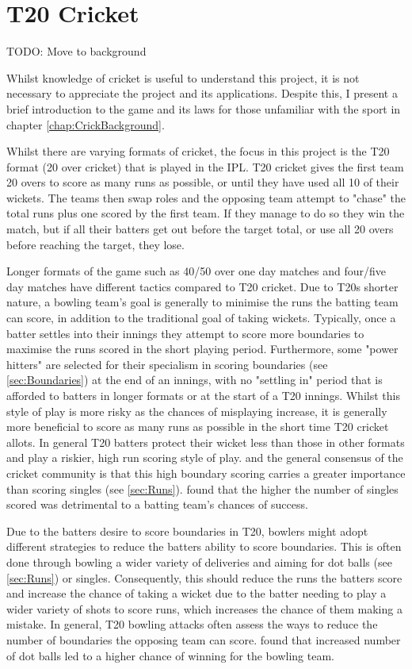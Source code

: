 \documentclass[12pt,a4paper]{report}
\theoremstyle{definition}
\begin{document}
\section{T20 Cricket} \label{sec:T20Cricket}

TODO: Move to background

Whilst knowledge of cricket is useful to understand this project, it is not necessary to appreciate the project and its applications.
Despite this, I present a brief introduction to the game and its laws for those unfamiliar with the sport in chapter \ref{chap:CrickBackground}.

Whilst there are varying formats of cricket, the focus in this project is the T20 format (20 over cricket) that is played in the IPL.
T20 cricket gives the first team 20 overs to score as many runs as possible, or until they have used all 10 of their wickets.
The teams then swap roles and the opposing team attempt to "chase" the total runs plus one scored by the first team. 
If they manage to do so they win the match, but if all their batters get out before the target total, or use all 20 overs before reaching the target, they lose.

Longer formats of the game such as 40/50 over one day matches and four/five day matches have different tactics compared to T20 cricket.
Due to T20s shorter nature, a bowling team's goal is generally to minimise the runs the batting team can score, in addition to the traditional goal of taking wickets.
Typically, once a batter settles into their innings they attempt to score more boundaries to maximise the runs scored in the short playing period.
Furthermore, some "power hitters" are selected for their specialism in scoring boundaries (see \ref{sec:Boundaries}) at the end of an innings, with no "settling in" period that is afforded to batters in longer formats or at the start of a T20 innings.
Whilst this style of play is more risky as the chances of misplaying increase, it is generally more beneficial to score as many runs as possible in the short time T20 cricket allots.
In general T20 batters protect their wicket less than those in other formats and play a riskier, high run scoring style of play.
\citet{Irvine2017} and the general consensus of the cricket community is that this high boundary scoring carries a greater importance than scoring singles (see \ref{sec:Runs}). 
\citet{Irvine2017} found that the higher the number of singles scored was detrimental to a batting team's chances of success.

Due to the batters desire to score boundaries in T20, bowlers might adopt different strategies to reduce the batters ability to score boundaries. 
This is often done through bowling a wider variety of deliveries and aiming for dot balls (see \ref{sec:Runs}) or singles.
Consequently, this should reduce the runs the batters score and increase the chance of taking a wicket due to the batter needing to play a wider variety of shots to score runs, which increases the chance of them making a mistake.
In general, T20 bowling attacks often assess the ways to reduce the number of boundaries the opposing team can score.
\citet{Irvine2017} found that increased number of dot balls led to a higher chance of winning for the bowling team. 
\end{document}
